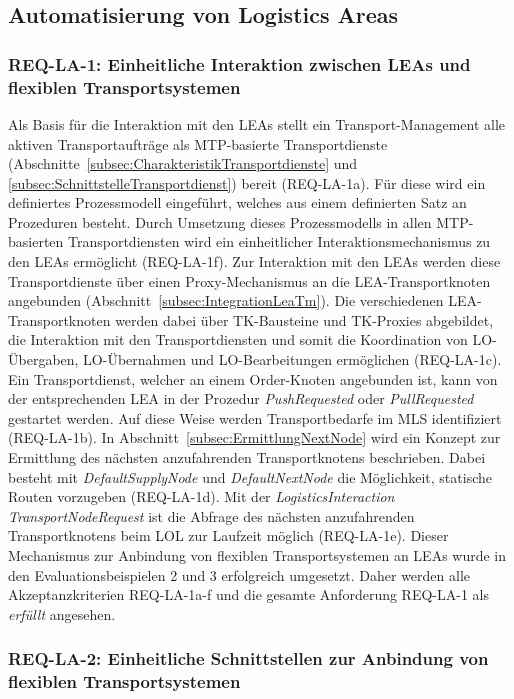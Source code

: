 \subsection{Automatisierung von Logistics Areas}

\subsubsection{REQ-LA-1: Einheitliche Interaktion zwischen LEAs und flexiblen Transportsystemen}

Als Basis für die Interaktion mit den LEAs stellt ein Transport-Management alle aktiven Transportaufträge als MTP-basierte Transportdienste (Abschnitte~\ref{subsec:CharakteristikTransportdienste} und \ref{subsec:SchnittstelleTransportdienst}) bereit (REQ-LA-1a). Für diese wird ein definiertes Prozessmodell eingeführt, welches aus einem definierten Satz an Prozeduren besteht. Durch Umsetzung dieses Prozessmodells in allen MTP-basierten Transportdiensten wird ein einheitlicher Interaktionsmechanismus zu den LEAs ermöglicht (REQ-LA-1f). Zur Interaktion mit den LEAs werden diese Transportdienste über einen Proxy-Mechanismus an die LEA-Transportknoten angebunden (Abschnitt~\ref{subsec:IntegrationLeaTm}). Die verschiedenen LEA-Transportknoten werden dabei über TK-Bausteine und TK-Proxies abgebildet, die Interaktion mit den Transportdiensten und somit die Koordination von LO-Über\-ga\-ben, LO-Übernahmen und LO-Bearbeitungen ermöglichen (REQ-LA-1c). Ein Transportdienst, welcher an einem Order-Knoten angebunden ist, kann von der entsprechenden LEA in der Prozedur \emph{PushRequested} oder \emph{PullRequested} gestartet werden. Auf diese Weise werden Transportbedarfe im MLS identifiziert (REQ-LA-1b). In Abschnitt~\ref{subsec:ErmittlungNextNode} wird ein Konzept zur Ermittlung des nächsten anzufahrenden Transportknotens beschrieben. Dabei besteht mit \emph{DefaultSupplyNode} und \emph{DefaultNextNode} die Möglichkeit, statische Routen vorzugeben (REQ-LA-1d). Mit der \emph{LogisticsInteraction} \emph{TransportNodeRequest} ist die Abfrage des nächsten anzufahrenden Transportknotens beim LOL zur Laufzeit möglich (REQ-LA-1e). Dieser Mechanismus zur Anbindung von flexiblen Transportsystemen an LEAs wurde in den Evaluationsbeispielen 2 und 3 erfolgreich umgesetzt. Daher werden alle Akzeptanzkriterien REQ-LA-1a-f und die gesamte Anforderung REQ-LA-1 als \emph{erfüllt} angesehen.

\subsubsection{REQ-LA-2: Einheitliche Schnittstellen zur Anbindung von flexiblen Transportsystemen}

